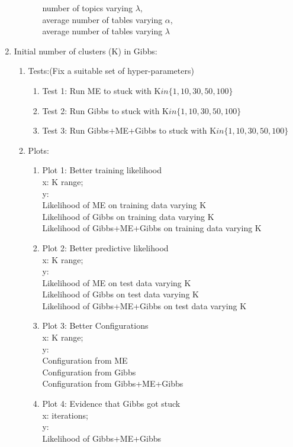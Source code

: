 \documentclass{article}
\begin{document}
\begin{spacing}{1.1}
\begin{enumerate}
\begin{enumerate}
\begin{enumerate}
number of topics varying $\lambda$, \\
average number of tables varying $\alpha$, \\
average number of tables varying $\lambda$
\end{enumerate}
\end{enumerate}
 \item Initial number of clusters (K) in Gibbs:
\begin{enumerate}
\item Tests:(Fix a suitable set of hyper-parameters)
\begin{enumerate}
\item Test 1: Run ME to stuck with K$in\{1,10,30,50,100\}$
\item Test 2: Run Gibbs to stuck with K$in\{1,10,30,50,100\}$
\item Test 3: Run Gibbs+ME+Gibbs to stuck with K$in\{1,10,30,50,100\}$
\end{enumerate}
\item Plots:
\begin{enumerate}
\item Plot 1: Better training likelihood\\ 
x: K range; \\
y: \\
Likelihood of ME on training data varying K\\
Likelihood of Gibbs on training data varying K\\
Likelihood of Gibbs+ME+Gibbs on training data varying K\\
\item Plot 2: Better predictive likelihood\\ 
x: K range; \\
y: \\
Likelihood of ME on test data varying K\\
Likelihood of Gibbs on test data varying K\\
Likelihood of Gibbs+ME+Gibbs on test data varying K\\
\item Plot 3: Better Configurations\\ 
x: K range; \\
y: \\
Configuration from ME\\ 
Configuration from Gibbs\\
Configuration from Gibbs+ME+Gibbs
\item Plot 4: Evidence that Gibbs got stuck\\ 
x: iterations; \\
y: \\
Likelihood of Gibbs+ME+Gibbs
\end{enumerate}
\end{enumerate}
\end{enumerate}


\end{spacing}
\end{document}
